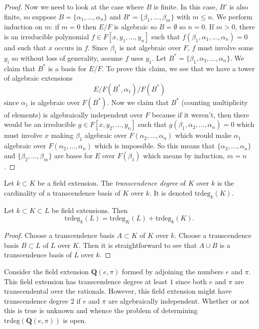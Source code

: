 \begin{proof}
\medskip\noindent
Now we need to look at the case where $B$ is finite.
In this case, $B'$ is also finite, so suppose
$B = \{\alpha_1, \ldots, \alpha_n\}$ and
$B' = \{\beta_1, \ldots, \beta_m\}$ with $m \leq n$.
We perform induction on $m$: if $m = 0$ then $E/F$ is algebraic so
$B = \emptyset$ so $n = 0$. If $m > 0$, there is an irreducible polynomial
$f \in F[x, y_1, \ldots, y_n]$ such that
$f(\beta_1, \alpha_1, \ldots, \alpha_n) = 0$ and such that $x$ occurs in $f$.
Since $\beta_1$ is not algebraic over $F$, $f$ must involve some $y_i$
so without loss of generality, assume $f$ uses $y_1$.
Let $B^* = \{\beta_1, \alpha_2, \ldots, \alpha_n\}$.
We claim that $B^*$ is a basis for $E/F$. To prove this claim, we see that
we have a tower of algebraic extensions
$$
E/ F(B^*, \alpha_1) / F(B^*)
$$
since $\alpha_1$ is algebraic over $F(B^*)$.
Now we claim that $B^*$ (counting multiplicity of elements) is
algebraically independent over $F$ because if it weren't, then there would be an
irreducible $g\in F[x, y_2, \ldots, y_n]$ such that
$g(\beta_1, \alpha_2, \ldots, \alpha_n) = 0$
which must involve $x$ making $\beta_1$
algebraic over $F(\alpha_2, \ldots, \alpha_n)$ which would make $\alpha_1$
algebraic over $F(\alpha_2, \ldots, \alpha_n)$ which is impossible.
So this means that $\{\alpha_2, \ldots, \alpha_n\}$ and
$\{\beta_2, \ldots, \beta_m\}$ are bases for $E$ over $F(\beta_1)$
which means by induction, $m = n$.
\end{proof}

\begin{definition}
\label{definition-transcendence-degree}
Let $k \subset K$ be a field extension.
The {\it transcendence degree} of $K$ over $k$ is
the cardinality of a transcendence basis of $K$ over $k$.
It is denoted $\text{trdeg}_k(K)$.
\end{definition}

\begin{lemma}
\label{lemma-transcendence-degree-tower}
Let $k \subset K \subset L$ be field extensions.
Then
$$
\text{trdeg}_k(L) =
\text{trdeg}_K(L) +
\text{trdeg}_k(K).
$$
\end{lemma}

\begin{proof}
Choose a transcendence basis $A \subset K$ of $K$ over $k$.
Choose a transcendence basis $B \subset L$ of $L$ over $K$.
Then it is straightforward to see that $A \cup B$ is a transcendence
basis of $L$ over $k$.
\end{proof}

\begin{example}
\label{example-pi-e-transcendental}
Consider the field extension $\mathbf{Q}(e, \pi)$ formed by
adjoining the numbers $e$ and $\pi$. This field extension has transcendence
degree at least $1$ since both $e$ and $\pi$ are transcendental over the
rationals. However, this field extension might have transcendence
degree $2$ if $e$ and $\pi$ are algebraically independent. Whether or
not this is true is unknown and whence the problem of determining
$\text{trdeg}(\mathbf{Q}(e, \pi))$ is open.
\end{example}

